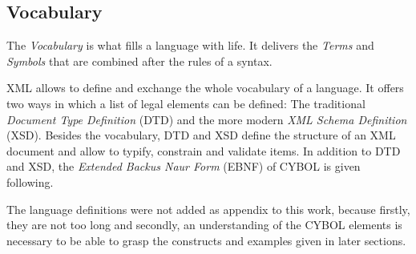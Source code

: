 %
%
%
%
%
%
%

\subsection{Vocabulary}
\label{vocabulary_heading}

The \emph{Vocabulary} is what fills a language with life. It delivers the
\emph{Terms} and \emph{Symbols} that are combined after the rules of a syntax.

XML allows to define and exchange the whole vocabulary of a language. It offers
two ways in which a list of legal elements can be defined: The traditional
\emph{Document Type Definition} (DTD) and the more modern
\emph{XML Schema Definition} (XSD). Besides the vocabulary, DTD and XSD define
the structure of an XML document and allow to typify, constrain and validate
items. In addition to DTD and XSD, the \emph{Extended Backus Naur Form} (EBNF)
of CYBOL is given following.

The language definitions were not added as appendix to this work, because
firstly, they are not too long and secondly, an understanding of the CYBOL
elements is necessary to be able to grasp the constructs and examples given in
later sections.


\clearpage


\clearpage

%

